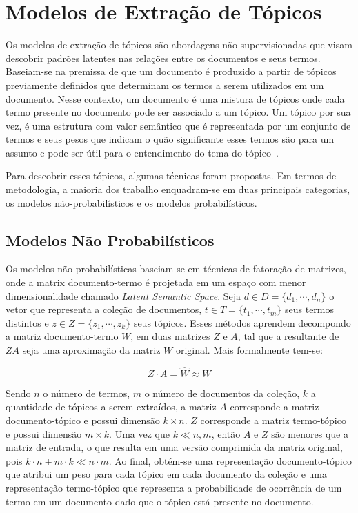
\section{Modelos de Extração de Tópicos}

Os modelos de extração de tópicos são abordagens não-supervisionadas que visam descobrir padrões latentes nas relações entre os documentos e seus termos.  Baseiam-se na premissa de que um documento é produzido a partir de tópicos previamente definidos que determinam os termos a serem utilizados em um documento. Nesse contexto, um documento é uma mistura de tópicos onde cada termo presente no documento pode ser associado a um tópico. Um tópico por sua vez, é uma estrutura com valor semântico que é representada por um conjunto de termos e seus pesos que indicam o quão significante esses termos são para um assunto e pode ser útil para o  entendimento do tema do tópico~\cite{Steyvers2007,Blei2012}.

Para descobrir esses tópicos, algumas técnicas foram propostas. Em termos de metodologia, a maioria dos trabalho enquadram-se em duas principais categorias, os modelos não-probabilísticos e os modelos probabilísticos.


\subsection{Modelos Não Probabilísticos}

Os modelos não-probabilísticas baseiam-se em técnicas de fatoração de matrizes, onde a matrix documento-termo é projetada em um espaço com menor dimensionalidade chamado \textit{Latent Semantic Space}. 
Seja
$d \in D = \{d_1,\cdots,d_n\}$ o vetor que representa a coleção de documentos, 
$t \in T = \{t_1,\cdots,t_m\}$ seus termos distintos e 
$z \in Z = \{z_1,\cdots,z_k\}$ seus tópicos. 
Esses métodos aprendem decompondo a matriz documento-termo $W$, em duas matrizes $Z$ e $A$, tal que a resultante de $ZA$ seja uma aproximação da matriz $W$ original. Mais formalmente tem-se:

\begin{equation}
	Z\cdot A = \hat{W} \approx W
\end{equation}

Sendo $n$ o número de termos, $m$ o número de documentos da coleção, $k$ a quantidade de tópicos a serem extraídos, a matriz $A$ corresponde a matriz documento-tópico e possui dimensão $k \times n$. $Z$ corresponde a matriz termo-tópico e possui dimensão $m \times k$. Uma vez que $k \ll n,m$, então $A$ e $Z$ são menores que a matriz de entrada, o que resulta em uma versão comprimida da matriz original, pois $k \cdot n + m \cdot k \ll n \cdot m$. Ao final, obtém-se uma representação documento-tópico que atribui um peso para cada tópico em cada documento da coleção e uma representação termo-tópico que representa a probabilidade de ocorrência de um termo em um documento dado que o tópico está presente no documento.

